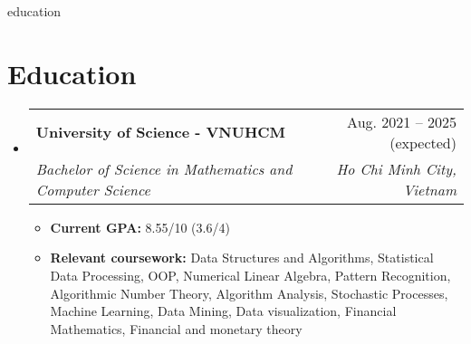 \documentclass[letterpaper,11pt]{article}
\makeatletter
\newcommand{\heading}[4]{
    \normalsize
    \begin{tabular*}{0.97\textwidth}[t]{l@{\extracolsep{\fill}}r}
      \textbf{#1} & #2 \\[-2pt]
      \textit{\small#3} & \textit{\small #4}
    \end{tabular*}
    \vspace{-2pt}
}
\makeatother
\begin{document}
\begin{filecontents*}[overwrite]{education}
    \section{Education}
    \begin{itemize}
        \item \heading{University of Science - VNUHCM}{Aug. 2021 -- 2025 (expected)}
          {Bachelor of Science in Mathematics and Computer Science}{Ho Chi Minh City, Vietnam}
        \begin{itemize}
            \item \textbf{Current GPA:} 8.55/10 (3.6/4)
            \item \textbf{Relevant coursework:}
            Data Structures and Algorithms, 
            Statistical Data Processing, 
            OOP, %
            Numerical Linear Algebra,
            Pattern Recognition,
            Algorithmic Number Theory,
            Algorithm Analysis,
            Stochastic Processes,
            Machine Learning,
            Data Mining,
            Data visualization,
            Financial Mathematics, 
            Financial and monetary theory
        \end{itemize}
    \end{itemize}
\end{filecontents*}
\end{document}
